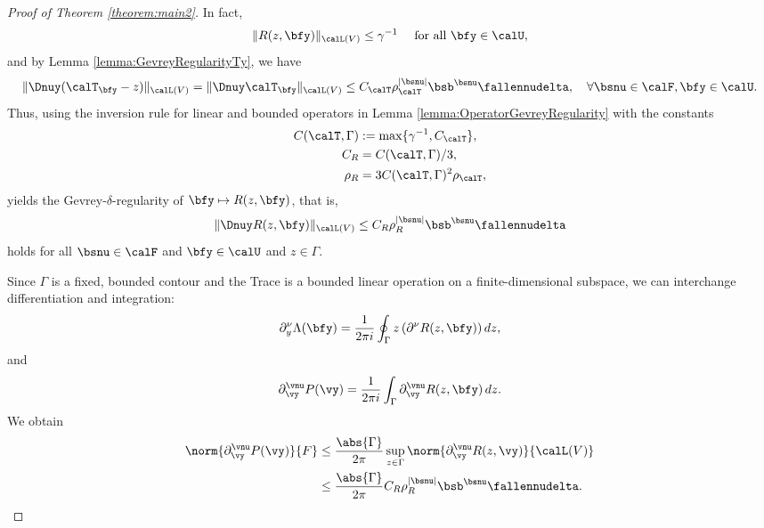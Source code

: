 \begin{proof}[Proof of Theorem \ref{theorem:main2}]
In fact,
\begin{equation*}
    \| R(z,\bfy) \|_{\calL(V)} \leq \gamma^{-1} \quad \text{ for all }  \bfy \in \calU,
\end{equation*} 
and by Lemma \ref{lemma:GevreyRegularityTy}, we have
\begin{equation*}
    \| \Dnuy  (\calT_\bfy - z )\|_{\calL(V)} =   \| \Dnuy  \calT_\bfy \|_{\calL(V)}\leq C_{\calT} \rho_{\calT}^{\vert \bsnu \vert} \bsb^{\bsnu} \fallennudelta, \quad \forall \bsnu \in \calF, \bfy \in \calU.
\end{equation*}
Thus, using the inversion rule for linear and bounded operators in Lemma \ref{lemma:OperatorGevreyRegularity} with the constants
\begin{align*}
   C(\calT,\Gamma)&:=   \max \{ \gamma^{-1}, C_{\calT} \}, \\
   C_R &= C(\calT,\Gamma)/3, \\
   \rho_R &= 3  C(\calT,\Gamma)^2 \rho_{\calT},
\end{align*} 
yields the Gevrey-$\delta$-regularity of $ \bfy \mapsto R(z,\bfy) $, that is, 
\begin{equation*}
    \| \Dnuy R(z,\bfy) \|_{\calL(V)} \leq C_R \rho_R^{\vert \bsnu \vert} \bsb^{\bsnu} \fallennudelta
\end{equation*}
holds for all $\bsnu \in \calF$ and $\bfy \in \calU$ and $z \in \Gamma$.

Since $\Gamma$ is a fixed, bounded contour and the Trace is a bounded linear operation on a finite-dimensional subspace, we can interchange differentiation and integration:
\begin{equation}
    \partial^\nu_y \Lambda(\bfy) = \frac{1}{2\pi i} \oint_{\Gamma} z \left( \partial^\nu R(z,\bfy) \right) dz,
\end{equation}
and
	\begin{equation*}
		\partial_{\vy}^{\vnu} P(\vy) = \frac{1}{2\pi i} \int_{\Gamma} \partial_{\vy}^{\vnu} R(z, \bfy)  \, dz.
	\end{equation*}
    We obtain
	\begin{align*}
		\norm{\partial_{\vy}^{\vnu} P(\vy)}{F}
		&\leq \frac{\abs{\Gamma}}{2\pi} \sup_{z \in \Gamma} \norm{\partial_{\vy}^{\vnu} R(z, \vy)}{\calL(V)} \\
		&\leq \frac{\abs{\Gamma}}{2\pi} C_R \rho_R^{\vert \bsnu \vert} \bsb^{\bsnu} \fallennudelta.
	\end{align*}
	

\end{proof}
